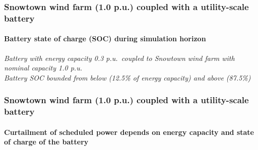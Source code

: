 \documentclass[presentation, smaller, table, svgnames]{beamer}
\begin{document}
\begin{frame}
	\frametitle{\large Snowtown wind farm (1.0 p.u.) coupled with a utility-scale battery}
	\framesubtitle{Battery state of charge (SOC) during simulation horizon}

	\begin{figure}[!h]
		\centering
    		\label{fig:disp_wind_bess}
		\scalebox{0.60}{
			
		}
	\end{figure}
	
	{\scriptsize \textit{Battery with energy capacity 0.3 p.u.\ coupled to Snowtown wind farm with nominal capacity 1.0 p.u.\\Battery SOC bounded from below (12.5\% of energy capacity) and above (87.5\%)}
	\par
	}

\end{frame}

\begin{frame}
	\frametitle{\large Snowtown wind farm (1.0 p.u.) coupled with a utility-scale battery}
	\framesubtitle{Curtailment of scheduled power depends on energy capacity and state of charge of the battery}

	\begin{figure}[!h]
		\centering
    		\label{fig:disp_wind_bess}
		\scalebox{0.75}{
			
		}
	\end{figure}

\end{frame}

%
%			
%

\end{document}

